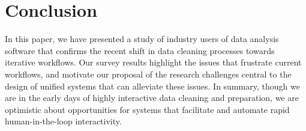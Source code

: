\section{Conclusion}
In this paper, we have presented a study of industry users of data analysis software that confirms the recent shift in data cleaning processes towards iterative workflows.
Our survey results highlight the issues that frustrate current workflows, and motivate our proposal of the research challenges central to the design of unified systems that can alleviate these issues.
In summary, though we are in the early days of highly interactive data cleaning and preparation, we are optimistic about opportunities for systems that facilitate and automate rapid human-in-the-loop interactivity.

